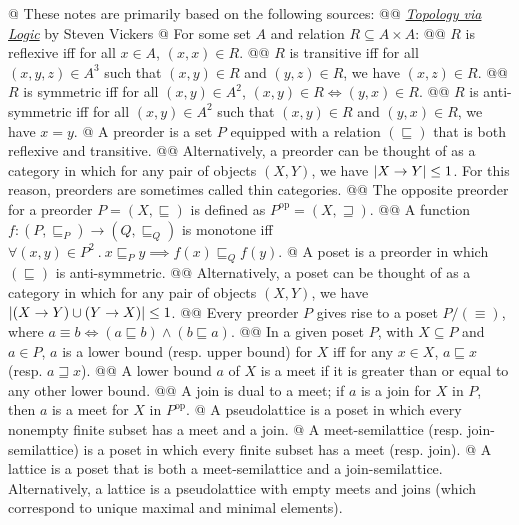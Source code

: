 \documentclass[]{article}
\DeclarePairedDelimiter{\abs}{\lvert}{\rvert}
\newcommand{\poset}[0]{\ensuremath{\mathrel{\sqsubseteq}}}
\newcommand{\tesop}[0]{\ensuremath{\mathrel{\sqsupseteq}}}
\newcommand{\opcat}[1]{{#1}^{\mathrm{op}}}
\newcommand{\define}[1]{\textsf{#1}}
\begin{document}
\begin{easylist}[itemize]
@ These notes are primarily based on the following sources:
@@ {%
  \href{https://dl.acm.org/citation.cfm?id=64996}{%
    \textit{Topology via Logic}}
  by Steven Vickers
}
@ For some set $A$ and relation $R \subseteq A \times A$:
@@ $R$ is \define{reflexive} iff for all $x \in A$, $(x, x) \in R$.
@@ {%
  $R$ is \define{transitive} iff for all $(x, y, z) \in A^3$ such that
  $(x, y) \in R$ and $(y, z) \in R$, we have $(x, z) \in R$.
}
@@ {%
  $R$ is \define{symmetric} iff for all $(x, y) \in A^2$,
  $(x, y) \in R \iff (y, x) \in R$.
}
@@ {%
  $R$ is \define{anti-symmetric} iff for all $(x, y) \in A^2$ such that
  $(x, y) \in R$ and $(y, x) \in R$, we have $x = y$.
}
@ {%
  A \define{preorder} is a set $P$ equipped with a relation $(\poset)$ that is
  both reflexive and transitive.
}
@@ {%
  Alternatively, a preorder can be thought of as a category in which for any
  pair of objects $(X, Y)$, we have $\abs{X \to Y} \le 1$. For this reason,
  preorders are sometimes called \define{thin categories}.
}
@@ {%
  The \define{opposite preorder} for a preorder $P = (X, \poset)$ is defined as
  $\opcat{P} = (X, \tesop)$.
}
@@ {%
  A function $f : (P, \poset_P) \to (Q, \poset_Q)$ is \define{monotone} iff
  $\forall (x, y) \in P^2 ~ . ~ x \poset_P y \implies f(x) \poset_Q f(y)$.
}
@ A \define{poset} is a preorder in which $(\poset)$ is anti-symmetric.
@@ {%
  Alternatively, a poset can be thought of as a category in which for any pair
  of objects $(X, Y)$, we have $\abs{(X \to Y) \cup (Y \to X)} \le 1$.
}
@@ {%
  Every preorder $P$ gives rise to a poset $P / (\equiv)$, where
  $a \equiv b \iff (a \poset b) \land (b \poset a)$.
}
@@ {%
  In a given poset $P$, with $X \subseteq P$ and $a \in P$, $a$ is a
  \define{lower bound} (resp. \define{upper bound}) for $X$ iff for any
  $x \in X$, $a \poset x$ (resp. $a \tesop x$).
}
@@ {%
  A lower bound $a$ of $X$ is a \define{meet} if it is greater than or equal to
  any other lower bound.
}
@@ {%
  A \define{join} is dual to a meet; if $a$ is a join for $X$ in $P$, then
  $a$ is a meet for $X$ in $\opcat{P}$.
}
@ {%
  A \define{pseudolattice} is a poset in which every nonempty finite subset has
  a meet and a join.
}
@ {%
  A \define{meet-semilattice} (resp. \define{join-semilattice}) is a poset in
  which every finite subset has a meet (resp. join).
}
@ {%
  A \define{lattice} is a poset that is both a meet-semilattice and a
  join-semilattice. Alternatively, a lattice is a pseudolattice with empty meets
  and joins (which correspond to unique maximal and minimal elements).
}
\end{easylist}
\end{document}
